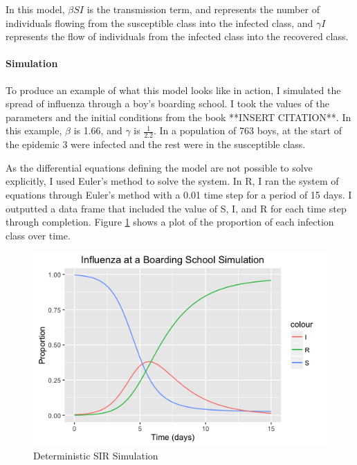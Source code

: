 \documentclass{article}
\begin{document}
In this model, $\beta SI$ is the transmission term, and represents the number of individuals flowing from the susceptible class into the infected class, and $\gamma I$ represents the flow of individuals from the infected class into the recovered class. 

\paragraph{Simulation}
To produce an example of what this model looks like in action, I simulated the spread of influenza through a boy's boarding school. I took the values of the parameters and the initial conditions from the book **INSERT CITATION**. In this example, $\beta$ is 1.66, and $\gamma$ is $\frac{1}{2.2}$. In a population of 763 boys, at the start of the epidemic 3 were infected and the rest were in the susceptible class. 

As the differential equations defining the model are not possible to solve explicitly, I used Euler's method to solve the system. In R, I ran the system of equations through Euler's method with a 0.01 time step for a period of 15 days. I outputted a data frame that included the value of S, I, and R for each time step through completion. Figure \ref{fig:SIRndSim} shows a plot of the proportion of each infection class over time. 
 
 \begin{figure}[h]
 \includegraphics[scale=.5, outer]{SIRndSim.png}
 \caption{Deterministic SIR Simulation}
 \label{fig:SIRndSim}
 \end{figure}
\end{document}
